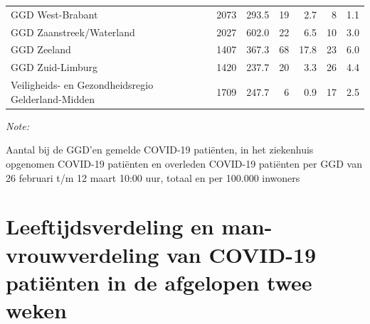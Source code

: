 \documentclass[
  english,
  man,floatsintext]{apa6}
\begin{document}
\begin{table}
\begin{threeparttable}
\begin{tabular}{lrrrrrr}
GGD West-Brabant & 2073 & 293.5 & 19 & 2.7 & 8 & 1.1\\
GGD Zaanstreek/Waterland & 2027 & 602.0 & 22 & 6.5 & 10 & 3.0\\
GGD Zeeland & 1407 & 367.3 & 68 & 17.8 & 23 & 6.0\\
GGD Zuid-Limburg & 1420 & 237.7 & 20 & 3.3 & 26 & 4.4\\
Veiligheids- en Gezondheidsregio Gelderland-Midden & 1709 & 247.7 & 6 & 0.9 & 17 & 2.5\\
\bottomrule
\end{tabular}
\begin{tablenotes}
\item \textit{Note: } 
\item Aantal bij de GGD’en gemelde COVID-19 patiënten, in het ziekenhuis opgenomen COVID-19 patiënten en overleden COVID-19 patiënten per GGD van 26 februari t/m 12 maart 10:00 uur, totaal en per 100.000 inwoners
\end{tablenotes}
\end{threeparttable}
\endgroup{}
\end{table}

\newpage

\hypertarget{leeftijdsverdeling-en-man-vrouwverdeling-van-covid-19-patiuxebnten-in-de-afgelopen-twee-weken}{%
\section{Leeftijdsverdeling en man-vrouwverdeling van COVID-19 patiënten in de afgelopen twee weken}\label{leeftijdsverdeling-en-man-vrouwverdeling-van-covid-19-patiuxebnten-in-de-afgelopen-twee-weken}}
\end{document}
